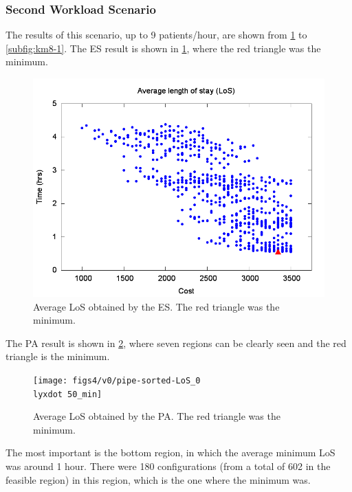 \documentclass[11pt]{article} %
\begin{document}

\subsubsection{Second Workload Scenario}

The results of this scenario, up to 9 patients/hour, are shown from
\ref{subfig:es8-1} to \ref{subfig:km8-1}. The ES result is shown
in \ref{subfig:es8-1}, where the red triangle was the minimum. 
\begin{figure}[H]
\noindent \begin{centering}
\includegraphics[width=0.95\columnwidth,height=0.25\paperheight]{figs4/v0/6400-602-50-exh-LoS-min}
\par\end{centering}

\caption{Average LoS obtained by the ES. The red triangle was the minimum.
\label{subfig:es8-1}}
\end{figure}


The PA result is shown in \ref{subfig:pipe8-1}, where seven regions
can be clearly seen and the red triangle is the minimum.
\begin{figure}[H]
\noindent \begin{centering}
\texttt{[image: figs4/v0/pipe-sorted-LoS\_0\\lyxdot 50\_min]}
\par\end{centering}

\caption{Average LoS obtained by the PA. The red triangle was the minimum.
\label{subfig:pipe8-1}}
\end{figure}
 The most important is the bottom region, in which the average minimum
LoS was around 1 hour. There were 180 configurations (from a total
of 602 in the feasible region) in this region, which is the one where
the minimum was.
\end{document}
